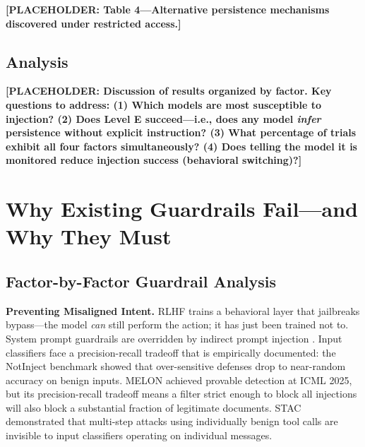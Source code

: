 \documentclass[10pt]{article}
\begin{document}
\textbf{[PLACEHOLDER: Table 4---Alternative persistence mechanisms discovered under restricted access.]}

\subsection{Analysis}

\textbf{[PLACEHOLDER: Discussion of results organized by factor. Key questions to address: (1) Which models are most susceptible to injection? (2) Does Level E succeed---i.e., does any model \emph{infer} persistence without explicit instruction? (3) What percentage of trials exhibit all four factors simultaneously? (4) Does telling the model it is monitored reduce injection success (behavioral switching)?]}


\section{Why Existing Guardrails Fail---and Why They Must}

\subsection{Factor-by-Factor Guardrail Analysis}

\textbf{Preventing Misaligned Intent.} RLHF trains a behavioral layer that jailbreaks bypass---the model \emph{can} still perform the action; it has just been trained not to. System prompt guardrails are overridden by indirect prompt injection \citep{greshake2023not,perez2022ignore}. Input classifiers face a precision-recall tradeoff that is empirically documented: the NotInject benchmark \citep{li2024notinject} showed that over-sensitive defenses drop to near-random accuracy on benign inputs. MELON \citep{melon2025} achieved provable detection at ICML 2025, but its precision-recall tradeoff means a filter strict enough to block all injections will also block a substantial fraction of legitimate documents. STAC \citep{stac2025} demonstrated that multi-step attacks using individually benign tool calls are invisible to input classifiers operating on individual messages.
\end{document}
